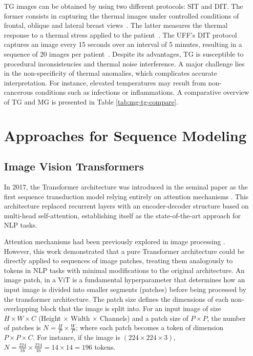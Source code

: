 \documentclass[runningheads]{llncs}
\begin{document}
\ac{TG} images can be obtained by using two different protocols:
\ac{SIT} and \ac{DIT}. The former consists in capturing the thermal
images under controlled conditions of frontal, oblique and lateral
breast views~\cite{Ryan2025}. The latter measures the thermal response
to a thermal stress applied to the
patient~\cite{Ryan2025,tsietso2022review}. The UFF's \ac{DIT} protocol
captures an image every 15 seconds over an interval of 5 minutes,
resulting in a sequence of 20 images per
patient~\cite{DeMatheus2023,VisualLab2014}. Despite its advantages, \ac{TG} is
susceptible to procedural inconsistencies and thermal noise
interference. A major challenge lies in the non-specificity of thermal
anomalies, which complicates accurate interpretation. For instance,
elevated temperatures may result from non-cancerous conditions such as
infections or inflammations. A comparative overview of \ac{TG} and
\ac{MG} is presented in Table \ref{tab:mg-tg-compare}.

\section{Approaches for Sequence Modeling}
\label{sec:appr-sequ-model}

\subsection{Image Vision Transformers}
\label{sec:vision-transformers}

In 2017, the Transformer architecture was introduced in the seminal
paper  as the first sequence
transduction model relying entirely on attention mechanisms
\cite{NIPS2017_3f5ee243}. This architecture replaced recurrent layers
with an encoder-decoder structure based on multi-head self-attention,
establishing itself as the state-of-the-art approach for \ac{NLP}
tasks.

Attention mechanisms had been previously explored in image processing
\cite{dosovitskiy2020image}. However, this work demonstrated that a
pure Transformer architecture could be directly applied to sequences
of image patches, treating them analogously to tokens in \ac{NLP}
tasks with minimal modifications to the original architecture. An
image patch, in a \ac{ViT} is a fundamental hyperparameter that
determines how an input image is divided into smaller segments
(patches) before being processed by the transformer architecture. The
patch size defines the dimensions of each non-overlapping block that
the image is split into. For an input image of size
\(H \times W \times C\) (Height × Width × Channels) and a patch size
of \(P \times P\), the number of patches is \(N = \frac{H}{P} \times
\frac{W}{P}\); where each patch becomes a token of dimension \(P
\times P \times C\). For instance, if the image is $(224 \times 224
\times 3)$, $N=\frac{224}{16}\times \frac{224}{16} = 14\times 14 =
196$ tokens.
\end{document}
